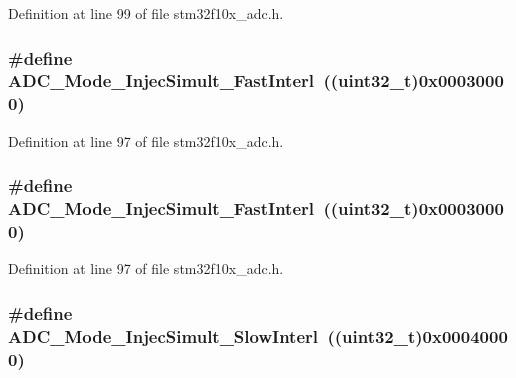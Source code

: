 Definition at line 99 of file stm32f10x\+\_\+adc.\+h.

\subsubsection[{\texorpdfstring{A\+D\+C\+\_\+\+Mode\+\_\+\+Injec\+Simult\+\_\+\+Fast\+Interl}{ADC_Mode_InjecSimult_FastInterl}}]{\setlength{\rightskip}{0pt plus 5cm}\#define A\+D\+C\+\_\+\+Mode\+\_\+\+Injec\+Simult\+\_\+\+Fast\+Interl~(({\bf uint32\+\_\+t})0x00030000)}\hypertarget{group___a_d_c__mode_ga2fc8a737f7b2375309bccbcb7fdbbfeb}{}\label{group___a_d_c__mode_ga2fc8a737f7b2375309bccbcb7fdbbfeb}


Definition at line 97 of file stm32f10x\+\_\+adc.\+h.

\subsubsection[{\texorpdfstring{A\+D\+C\+\_\+\+Mode\+\_\+\+Injec\+Simult\+\_\+\+Fast\+Interl}{ADC_Mode_InjecSimult_FastInterl}}]{\setlength{\rightskip}{0pt plus 5cm}\#define A\+D\+C\+\_\+\+Mode\+\_\+\+Injec\+Simult\+\_\+\+Fast\+Interl~(({\bf uint32\+\_\+t})0x00030000)}\hypertarget{group___a_d_c__mode_ga2fc8a737f7b2375309bccbcb7fdbbfeb}{}\label{group___a_d_c__mode_ga2fc8a737f7b2375309bccbcb7fdbbfeb}


Definition at line 97 of file stm32f10x\+\_\+adc.\+h.

\subsubsection[{\texorpdfstring{A\+D\+C\+\_\+\+Mode\+\_\+\+Injec\+Simult\+\_\+\+Slow\+Interl}{ADC_Mode_InjecSimult_SlowInterl}}]{\setlength{\rightskip}{0pt plus 5cm}\#define A\+D\+C\+\_\+\+Mode\+\_\+\+Injec\+Simult\+\_\+\+Slow\+Interl~(({\bf uint32\+\_\+t})0x00040000)}\hypertarget{group___a_d_c__mode_gacb72230cb48a577907729d426be69c22}{}\label{group___a_d_c__mode_gacb72230cb48a577907729d426be69c22}


